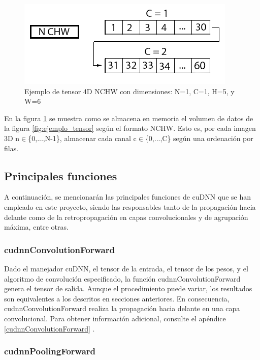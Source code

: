 \begin{figure}[H]
	\centering
	\includegraphics[scale=0.5]{imagenes/tensor_nchw.png}  
	\caption{Ejemplo de tensor 4D NCHW con dimensiones: N=1, C=1, H=5, y W=6}
	\label{fig:tensor_nchw}
\end{figure}

En la figura \ref{fig:tensor_nchw} se muestra como se almacena en memoria el volumen de datos de la figura \ref{fig:ejemplo_tensor} según el formato NCHW. Esto es, por cada imagen 3D n$\in$\{0,...,N-1\}, almacenar cada canal c$\in$\{0,...,C\} según una ordenación por filas.

\subsection{Principales funciones}

A continuación, se mencionarán las principales funciones de cuDNN que se han empleado en este proyecto, siendo las responsables tanto de la propagación hacia delante como de la retropropagación en capas convolucionales y de agrupación máxima, entre otras.

\subsubsection{cudnnConvolutionForward}

Dado el manejador cuDNN, el tensor de la entrada, el tensor de los pesos, y el algoritmo de convolución especificado, la función cudnnConvolutionForward genera el tensor de salida. Aunque el procedimiento puede variar, los resultados son equivalentes a los descritos en secciones anteriores. En consecuencia, cudnnConvolutionForward realiza la propagación hacia delante en una capa convolucional. Para obtener información adicional, consulte el apéndice \ref{cudnnConvolutionForward} \cite{cuDNN_conv_fwd}.

\subsubsection{cudnnPoolingForward}

